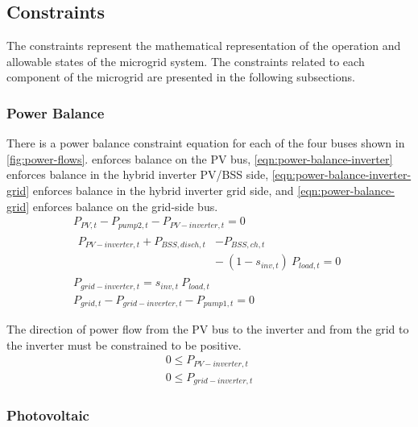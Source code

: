 \subsection{Constraints}

The constraints represent the mathematical representation of the operation and allowable states of the microgrid system. The constraints related to each component of the microgrid are presented in the following subsections.

\subsubsection{Power Balance}

There is a power balance constraint equation for each of the four buses shown in \cref{fig:power-flows}.  enforces balance on the PV bus, \cref{eqn:power-balance-inverter} enforces balance in the hybrid inverter PV/BSS side, \cref{eqn:power-balance-inverter-grid} enforces balance in the hybrid inverter grid side, and \cref{eqn:power-balance-grid} enforces balance on the grid-side bus.
%
\begin{gather}
\label{eqn:power-balance-PV}
P_{PV,t} - P_{pump2,t} - P_{PV-inverter,t} = 0 \\
\label{eqn:power-balance-inverter}
\begin{split}
P_{PV-inverter,t} + P_{BSS,disch,t}& - P_{BSS,ch,t} \\
 &{-} \: \left( 1 - s_{inv,t}\right) \ P_{load,t} = 0 
\end{split}
\\
\label{eqn:power-balance-inverter-grid}
P_{grid-inverter,t} = s_{inv,t} \ P_{load,t} \\
\label{eqn:power-balance-grid}
P_{grid,t} - P_{grid-inverter,t} - P_{pump1,t} = 0
\end{gather}

The direction of power flow from the PV bus to the inverter and from the grid to the inverter must be constrained to be positive.
%
\begin{gather}
\label{eqn:pv-inverter-positive}
0 \le P_{PV-inverter,t} \\
\label{eqn:grid-inverter-positive}
0 \le P_{grid-inverter,t}
\end{gather}

\subsubsection{Photovoltaic}

